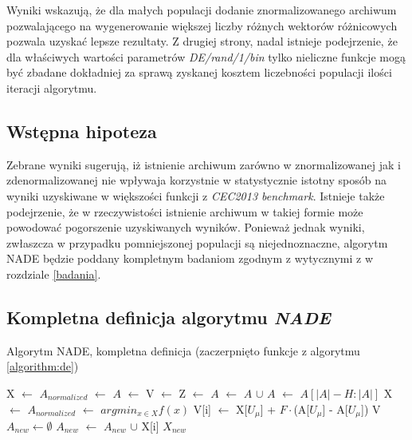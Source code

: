 \documentclass[12pt,a4paper]{report}
\begin{document}
{{{{{{\par{
Wyniki wskazują, że dla małych populacji dodanie znormalizowanego archiwum pozwalającego na wygenerowanie większej liczby różnych wektorów różnicowych pozwala uzyskać lepsze rezultaty. Z drugiej strony, nadal istnieje podejrzenie, że dla właściwych wartości parametrów \emph{DE/rand/1/bin} tylko nieliczne funkcje mogą być zbadane dokładniej za sprawą zyskanej kosztem liczebności populacji ilości iteracji algorytmu.
}
\subsection{Wstępna hipoteza}
\par{
Zebrane wyniki sugerują, iż istnienie archiwum zarówno w znormalizowanej jak i zdenormalizowanej nie wpływaja korzystnie w statystycznie istotny sposób na wyniki uzyskiwane w większości funkcji z \emph{CEC2013 benchmark}. Istnieje także podejrzenie, że w rzeczywistości istnienie archiwum w takiej formie może powodować pogorszenie uzyskiwanych wyników. Ponieważ jednak wyniki, zwłaszcza w przypadku pomniejszonej populacji są niejednoznaczne, algorytm NADE będzie poddany kompletnym badaniom zgodnym z wytycznymi z \cite{Li13benchmarkfunctions} w rozdziale \ref{badania}.
}

\subsection{Kompletna definicja algorytmu \emph{NADE}}
\begin{algorithm}[H]
\caption{Algorytm NADE, kompletna definicja (zaczerpnięto funkcje z algorytmu \ref{algorithm:de})}
\label{algorithm:nade}
\begin{algorithmic}[1]
    \State X $\gets$ 
    \State $A_{normalized}$ $\gets$ 
        \State $A$ $\gets$ 
	    \State V $\gets$ 
        \State Z $\gets$ 
        \State $A$ $\gets$ $A$ $\cup$ 
	        \State $A$ $\gets$ $A[|A|-H:|A|]$
        \EndIf
        \State X $\gets$ 
        \State $A_{normalized}$ $\gets$ 
    \EndWhile
    \State \Return $argmin_{x \in X} f(x)$
\EndFunction
\State
{}
    	\State V[i] $\gets$ X[$U_\mu$] + $F \cdot $(A[$U_\mu$] - A[$U_\mu$])
    \EndFor
    \State \Return V
\EndFunction
\State
{}
	\State $A_{new} \gets \emptyset$
            \State $A_{new}$ $\gets$ $A_{new}$ $\cup$ X[i]
        \EndIf
    \EndFor
    \State \Return $X_{new}$
\EndFunction
\end{algorithmic}
\end{algorithm}


}}}}}}
\end{document}

